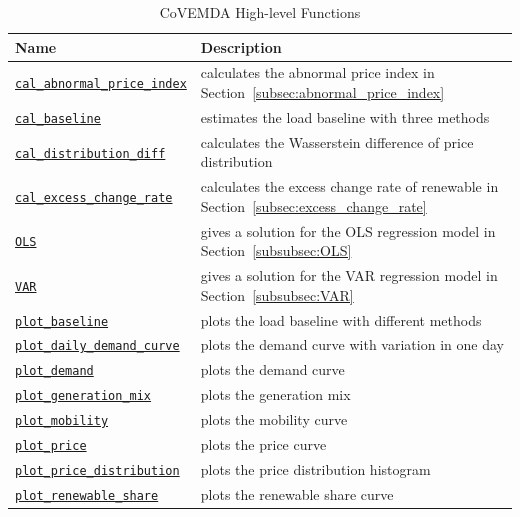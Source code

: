 \documentclass[10pt]{article}
\newcommand{\covemda}{CoVEMDA}
\numberwithin{equation}{section}
\numberwithin{table}{section}
\numberwithin{figure}{section}
\begin{document}
\begin{appendices}
\begin{table}[!ht]
    \centering
    \begin{threeparttable}
    \caption{\covemda{} High-level Functions}
    \label{tab:high_level_func}
    \footnotesize
    \begin{tabular}{ll}
        \toprule
        Name & Description \\
        \midrule
        \hyperref[func:cal_abnormal_price_index]{\texttt{cal\_abnormal\_price\_index}} & calculates the abnormal price index in Section~\ref{subsec:abnormal_price_index} \\
        \hyperref[func:cal_baseline]{\texttt{cal\_baseline}} & estimates the load baseline with three methods \\
        \hyperref[func:cal_distribution_diff]{\texttt{cal\_distribution\_diff}} & calculates the Wasserstein difference of price distribution \\
        \hyperref[func:cal_excess_change_rate]{\texttt{cal\_excess\_change\_rate}} & calculates the excess change rate of renewable in Section~\ref{subsec:excess_change_rate} \\
        \hyperref[func:OLS]{\texttt{OLS}} & gives a solution for the OLS regression model in Section~\ref{subsubsec:OLS}\\
        \hyperref[func:VAR]{\texttt{VAR}} & gives a solution for the VAR regression model in Section~\ref{subsubsec:VAR}\\
        \hyperref[func:plot_baseline]{\texttt{plot\_baseline}} & plots the load baseline with different methods \\
        \hyperref[func:plot_daily_demand_curve]{\texttt{plot\_daily\_demand\_curve}} & plots the demand curve with variation in one day \\
        \hyperref[func:plot_demand]{\texttt{plot\_demand}} & plots the demand curve \\
        \hyperref[func:plot_generation_mix]{\texttt{plot\_generation\_mix}} & plots the generation mix \\
        \hyperref[func:plot_mobility]{\texttt{plot\_mobility}} & plots the mobility curve \\
        \hyperref[func:plot_price]{\texttt{plot\_price}} & plots the price curve \\
        \hyperref[func:plot_price_distribution]{\texttt{plot\_price\_distribution}} & plots the price distribution histogram \\
        \hyperref[func:plot_renewable_share]{\texttt{plot\_renewable\_share}} & plots the renewable share curve \\
        \bottomrule
    \end{tabular}
    \end{threeparttable}
\end{table}


\end{appendices}
\end{document}

